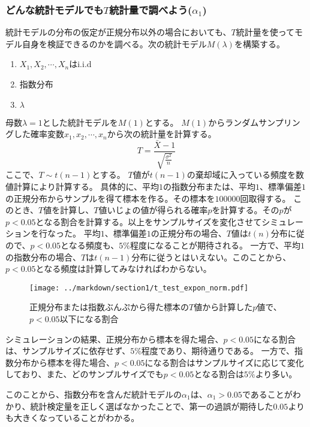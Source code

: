 \documentclass[a4paper,11pt,dvipdfmx]{jsarticle}
\begin{document}
\subsubsection{どんな統計モデルでも$T$統計量で調べよう($\alpha_1$)}
統計モデルの分布の仮定が正規分布以外の場合においても、$T$統計量を使ってモデル自身を検証できるのかを調べる。次の統計モデル$M(\lambda)$を構築する。
\begin{enumerate}
    \item $X_1,X_2,\cdots,X_n $はi.i.d
    \item 指数分布
    \item $\lambda$
\end{enumerate}
母数$\lambda=1$とした統計モデルを$M(1)$とする。
$M(1)$からランダムサンプリングした確率変数$x_1,x_2,\cdots,x_n$から次の統計量を計算する。
\begin{equation*}
    T = \frac{\bar{X}-1}{\sqrt{\frac{\sigma^2}{n}}}
\end{equation*}
ここで、$T \sim t(n-1)$とする。
$T$値が$t(n-1)$の棄却域に入っている頻度を数値計算により計算する。
具体的に、平均$1$の指数分布または、平均$1$、標準偏差$1$の正規分布からサンプルを得て標本を作る。その標本を$100000$回取得する。
このとき、$T$値を計算し、$T$値いじょの値が得られる確率$p$を計算する。その$p$が$p<0.05$となる割合を計算する。以上をサンプルサイズを変化させてシミュレーションを行なった。
平均$1$、標準偏差$1$の正規分布の場合、$T$値は$t(n)$分布に従ので、$p<0.05$となる頻度も、$5\%$程度になることが期待される。
一方で、平均$1$の指数分布の場合、$T$は$t(n-1)$分布に従うとはいえない。このことから、$p<0.05$となる頻度は計算してみなければわからない。


\begin{figure}
    \begin{center}
        \texttt{[image: ../markdown/section1/t\_test\_expon\_norm.pdf]}
        \caption{正規分布または指数ぶんぷから得た標本の$T$値から計算した$p$値で、$p<0.05$以下になる割合}
    \end{center}
\end{figure}

シミュレーションの結果、正規分布から標本を得た場合、$p<0.05$になる割合は、サンプルサイズに依存せず、$5\%$程度であり、期待通りである。
一方で、指数分布から標本を得た場合、$p<0.05$になる割合はサンプルサイズに応じて変化しており、また、どのサンプルサイズでも$p<0.05$となる割合は$5\%$より多い。

このことから、指数分布を含んだ統計モデルの$\alpha_1$は、$\alpha_1>0.05$であることがわかり、統計検定量を正しく選ばなかったことで、第一の過誤が期待した$0.05$よりも大きくなっていることがわかる。
\end{document}
